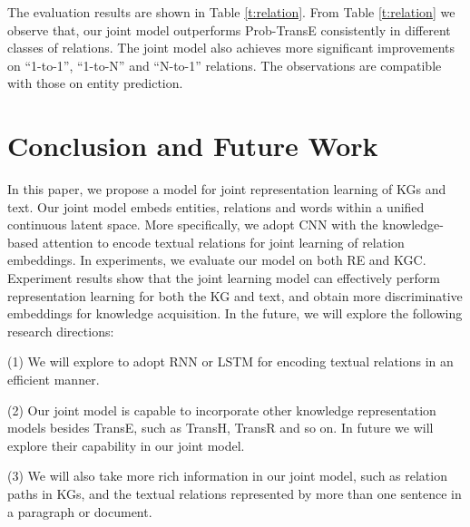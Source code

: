 \documentclass[11pt,a4paper]{article}
\begin{document}
The evaluation results are shown in Table \ref{t:relation}. From Table \ref{t:relation} we observe that, our joint model outperforms Prob-TransE consistently in different classes of relations. The joint model also achieves more significant improvements on ``1-to-1'', ``1-to-N'' and ``N-to-1'' relations. The observations are compatible with those on entity prediction.


\section{Conclusion and Future Work}

In this paper, we propose a model for joint representation learning of KGs and text. Our joint model embeds entities, relations and words within a unified continuous latent space. More specifically, we adopt CNN with the knowledge-based attention to encode textual relations for joint learning of relation embeddings. In experiments, we evaluate our model on both RE and KGC. Experiment results show that the joint learning model can effectively perform representation learning for both the KG and text, and obtain more discriminative embeddings for knowledge acquisition. In the future, we will explore the following research directions: 

(1) We will explore to adopt RNN or LSTM for encoding textual relations in an efficient manner.

(2) Our joint model is capable to incorporate other knowledge representation models besides TransE, such as TransH, TransR and so on. In future we will explore their capability in our joint model. 

(3) We will also take more rich information in our joint model, such as relation paths in KGs, and the textual relations represented by more than one sentence in a paragraph or document.



\end{document}
